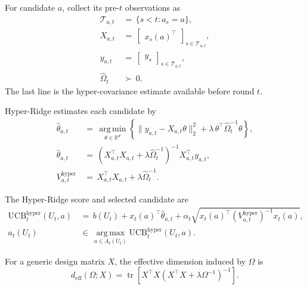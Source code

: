 \documentclass{article} %
\begin{document}
For candidate \(a\), collect its pre-\(t\) observations as
\begin{align}
\mathcal T_{a,t}
&\,=\,
\{s<t:a_s=a\},
\label{eq:hyper-index-set}
\\
X_{a,t}
&\,=\,
\begin{bmatrix}
x_s(a)^\top
\end{bmatrix}_{s\in\mathcal T_{a,t}},
\label{eq:hyper-design-app}
\\
y_{a,t}
&\,=\,
\begin{bmatrix}
y_s
\end{bmatrix}_{s\in\mathcal T_{a,t}},
\label{eq:hyper-response}
\\
\widehat\Omega_t
&\,\succ\,
0.
\label{eq:hyper-omega-hat}
\end{align}
The last line is the hyper-covariance estimate available before round \(t\).

Hyper-Ridge estimates each candidate by
\begin{align}
\widehat{\theta}_{a,t}
&\,=\,
\operatorname*{arg\,min}_{\theta\in\mathbb{R}^d}
\left\{
\|y_{a,t}-X_{a,t}\theta\|_2^2
+
\lambda\,\theta^\top\widehat{\Omega}_t^{-1}\theta
\right\},
\label{eq:hyper-estimator-argmin}
\\
\widehat{\theta}_{a,t}
&\,=\,
\left(
X_{a,t}^\top X_{a,t}
+
\lambda \widehat{\Omega}_t^{-1}
\right)^{-1}
X_{a,t}^\top y_{a,t},
\label{eq:hyper-estimator-closed}
\\
V_{a,t}^{\mathrm{hyper}}
&\,=\,
X_{a,t}^\top X_{a,t}
+
\lambda\widehat{\Omega}_t^{-1}.
\label{eq:hyper-vhat}
\end{align}

The Hyper-Ridge score and selected candidate are
\begin{align}
\mathrm{UCB}_{t}^{\mathrm{hyper}}(U_t,a)
&\,=\,
b(U_t)+x_t(a)^\top \widehat{\theta}_{a,t}
+
\alpha_t
\sqrt{
x_t(a)^\top
\left(V_{a,t}^{\mathrm{hyper}}\right)^{-1}
x_t(a)
},
\label{eq:hyper-ucb-app}
\\
a_t(U_t)
&\,\in\,
\operatorname*{arg\,max}_{a\in A_t(U_t)}
\mathrm{UCB}_{t}^{\mathrm{hyper}}(U_t,a).
\label{eq:hyper-action}
\end{align}

For a generic design matrix \(X\), the effective dimension induced by \(\Omega\) is
\begin{equation}
\label{eq:hyper-deff-app}
d_{\mathrm{eff}}(\Omega;X)
=
\operatorname{tr}
\!\left[
X^\top X
\left(
X^\top X+\lambda\Omega^{-1}
\right)^{-1}
\right].
\end{equation}
\end{document}
